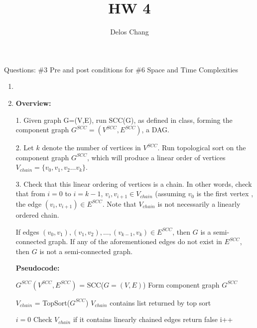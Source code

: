 \documentclass[a4paper]{report}
\title{HW 4}
\author{Delos Chang}
\date{}
\begin{document}
    Questions:
      \#3 Pre and post conditions for 
      \#6 Space and Time Complexities
  \begin{enumerate}
    \item 


    \par
    \bigskip

    \item 
      {\bf Overview:}

      1. Given graph G=(V,E), run SCC(G), as defined in class, 
      forming the component graph $G^{SCC} = (V^{SCC}, E^{SCC})$, a DAG. 

      2. Let $k$ denote the number of vertices in $V^{SCC}$. Run topological sort on the component graph $G^{SCC}$, 
      which will produce a linear order of vertices $V_{chain} = \{v_{0}, v_{1}, v_{2} \dots v_{k}\}$. 

      3. Check that this linear ordering of vertices is a chain. 
      In other words, check that from $i=0$ to $i=k-1$, $v_{i},v_{i+1} \in V_{chain}$ (assuming $v_{0}$ is the first vertex
      , the edge $(v_{i},v_{i+1}) \in E^{SCC}$.
      Note that $V_{chain}$ is not necessarily a linearly ordered chain.

      If edges $(v_{0}, v_{1}), (v_{1},v_{2}),\dots,(v_{k-1},v_{k}) \in E^{SCC}$, then $G$ is a semi-connected graph.
      If any of the aforementioned edges do not exist in $E^{SCC}$, then $G$ is not a semi-connected graph. 

      {\bf Pseudocode:}

      \begin{algorithmic}[1]

        \State $G^{SCC}(V^{SCC},E^{SCC})$ = SCC($G=(V,E)$)
        \Comment Form component graph $G^{SCC}$

        \State $V_{chain}$ = TopSort($G^{SCC}$)
        \Comment $V_{chain}$ contains list returned by top sort

        \State $i=0$
        \Comment Check $V_{chain}$ if it contains linearly chained edges
            \State return false
          \EndIf
          \State i++


\end{algorithmic}
\end{enumerate}
\end{document}
